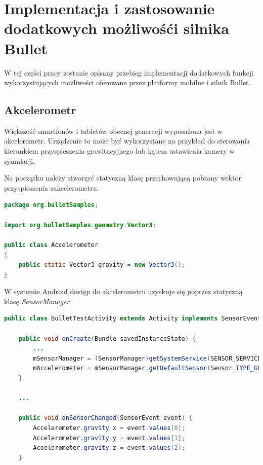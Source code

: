 \newpage
\section{Implementacja i zastosowanie dodatkowych możliwośći silnika Bullet}
W tej części pracy zostanie opisany przebieg implementacji dodatkowych funkcji
wykorzystujących możliwości oferowane przez platformy mobilne i silnik Bullet.

\subsection{Akcelerometr}
Większość smartfonów i tabletów obecnej generacji wyposażona jest w
akcelerometr. Urządzenie to może być wykorzystane na przykład do sterowania
kierunkiem przyspieszenia grawitacyjnego lub kątem ustawienia kamery w
symulacji.

Na początku należy stworzyć statyczną klasę przechowującą pobrany wektor
przyspieszenia zakcelerometru.

\begin{lstlisting}[language=java, caption=Klasa Accelerometer przechowująca
dane pobrane z akcelerometru.]
package org.bulletSamples;
 
import org.bulletSamples.geometry.Vector3;
 
public class Accelerometer
{
	public static Vector3 gravity = new Vector3();
}
\end{lstlisting}

W systemie Android dostęp do akcelerometru uzyskuje się poprzez statyczną klasę
\emph{SensorManager}.

\begin{lstlisting}[language=java, caption=Pobranie wektora przyspieszenia z
akcelerometru.] public class BulletTestActivity extends Activity implements SensorEventListener {

	public void onCreate(Bundle savedInstanceState) {
		...
		mSensorManager = (SensorManager)getSystemService(SENSOR_SERVICE);
		mAccelerometer = mSensorManager.getDefaultSensor(Sensor.TYPE_GRAVITY);
    }
    
	...
    
    public void onSensorChanged(SensorEvent event) {
		Accelerometer.gravity.x = event.values[0];
		Accelerometer.gravity.y = event.values[1];
		Accelerometer.gravity.z = event.values[2];
	}
\end{lstlisting}

